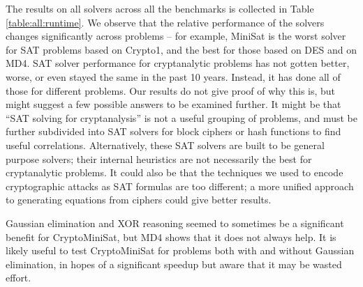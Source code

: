 The results on all solvers across all the benchmarks is collected in Table \ref{table:all:runtime}. We observe that the relative performance of the solvers changes significantly across problems -- for example, MiniSat is the worst solver for SAT problems based on Crypto1, and the best for those based on DES and on MD4. SAT solver performance for cryptanalytic problems has not gotten better, worse, or even stayed the same in the past 10 years. Instead, it has done all of those for different problems. Our results do not give proof of why this is, but might suggest a few possible answers to be examined further. It might be that ``SAT solving for cryptanalysis'' is not a useful grouping of problems, and must be further subdivided into SAT solvers for block ciphers or hash functions to find useful correlations. Alternatively, these SAT solvers are built to be general purpose solvers; their internal heuristics are not necessarily the best for cryptanalytic problems. It could also be that the techniques we used to encode cryptographic attacks as SAT formulas are too different; a more unified approach to generating equations from ciphers could give better results.

Gaussian elimination and XOR reasoning seemed to sometimes be a significant benefit for CryptoMiniSat, but MD4 shows that it does not always help. It is likely useful to test CryptoMiniSat for problems both with and without Gaussian elimination, in hopes of a significant speedup but aware that it may be wasted effort. 